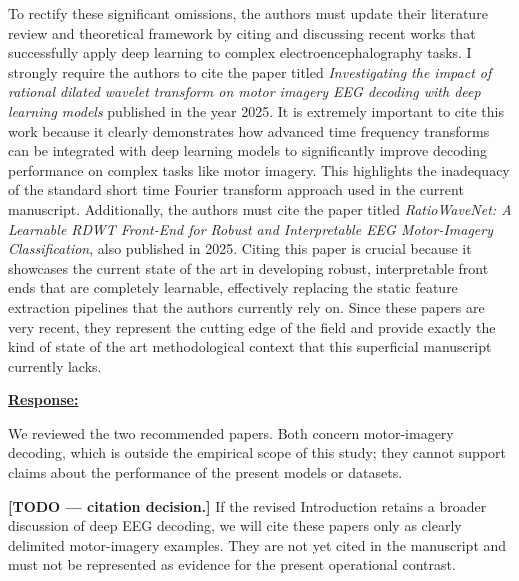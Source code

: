 \documentclass{article}
\begin{document}
\begin{cmt}{}{}

To rectify these significant omissions, the authors must update their literature
review and theoretical framework by citing and discussing recent works that
successfully apply deep learning to complex electroencephalography tasks. I
strongly require the authors to cite the paper titled \textit{Investigating the
impact of rational dilated wavelet transform on motor imagery EEG decoding with
deep learning models} published in the year 2025. It is extremely important to
cite this work because it clearly demonstrates how advanced time frequency
transforms can be integrated with deep learning models to significantly improve
decoding performance on complex tasks like motor imagery. This highlights the
inadequacy of the standard short time Fourier transform approach used in the
current manuscript. Additionally, the authors must cite the paper titled
\textit{RatioWaveNet: A Learnable RDWT Front-End for Robust and Interpretable
EEG Motor-Imagery Classification}, also published in 2025. Citing this paper is
crucial because it showcases the current state of the art in developing robust,
interpretable front ends that are completely learnable, effectively replacing
the static feature extraction pipelines that the authors currently rely on.
Since these papers are very recent, they represent the cutting edge of the field
and provide exactly the kind of state of the art methodological context that
this superficial manuscript currently lacks.

\end{cmt}
\vspace{0.1cm}
\noindent
\underline{\textbf{Response:}}
\vspace{0.2cm}

We reviewed the two recommended papers. Both concern motor-imagery decoding,
which is outside the empirical scope of this study; they cannot support claims
about the performance of the present models or datasets.

\textbf{[TODO --- citation decision.]}
If the revised Introduction retains a broader discussion of deep EEG decoding,
we will cite these papers only as clearly delimited motor-imagery examples. They
are not yet cited in the manuscript and must not be represented as evidence for
the present operational contrast.

\vspace{0.3cm}
\end{document}
